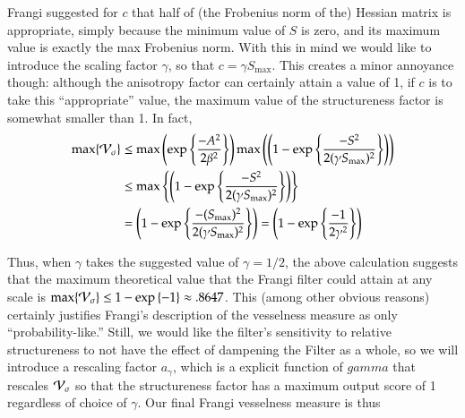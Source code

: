 Frangi suggested for $c$ that half of (the Frobenius norm of the) Hessian matrix is appropriate, simply because the minimum value of $S$ is zero, and its maximum value is exactly the max Frobenius norm. With this in mind we would like to introduce the scaling factor
$\gamma$, so that $ c = \gamma S_{\max}$. This creates a minor annoyance though: although the anisotropy factor can certainly attain a value of 1, if $c$ is to take this ``appropriate'' value, the maximum value of the structureness factor is somewhat smaller than 1. In fact,
\begin{equation}
\begin{aligned}
\max\{\mathcal{V}_{\sigma}\} &\le \max\left(
\exp\left\{\frac{-A^2}{2\beta^2}\right\}
\right)
\max\left(
\left(1 - \exp\left\{\frac{-S^2}{2(\gamma S_{\max})^2}\right\}\right)
\right) \\
&\le \max\left\{
\left(1 - \exp\left\{\frac{-S^2}{2(\gamma S_{\max})^2}\right\}\right)
\right\} \\
&= 
\left(1 - \exp\left\{\frac{-(S_{\max})^2}{2(\gamma S_{\max})^2}\right\}
\right)
= \left(1 - \exp\left\{\frac{-1}{2\gamma^2}\right\}
\right)
\end{aligned}
\end{equation}

Thus, when $\gamma$ takes the suggested value of $\gamma = 1/2$, the above calculation suggests that
the maximum theoretical value that the Frangi filter could attain at any scale is
$ \max \{ \mathcal{V}_{\sigma} \} \le 1 - \exp\left\{ -1 \right\} \approx .8647$.
This (among other obvious reasons) certainly justifies Frangi's description of the vesselness measure as only ``probability-like.'' Still, we would like the filter's sensitivity to relative structureness to not have the effect of dampening the Filter as a whole, so we will introduce a rescaling factor $a_\gamma$, which is a explicit function of $gamma$ that rescales $\mathcal{V}_{\sigma}$ so that the structureness factor has a maximum output score of 1 regardless of choice of $\gamma$. Our final Frangi vesselness measure is thus

